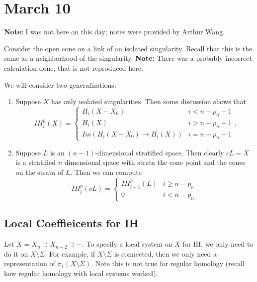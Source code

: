 \documentclass[leqno, openany]{memoir}
\theoremstyle{definition}
\theoremstyle{remark}
\theoremstyle{plain}
\theoremstyle{definition}
\theoremstyle{remark}
\begin{document}
\chapter{March 10}%
\label{cha:march_10}

\textbf{Note:} I was not here on this day; notes were provided by Arthur Wang.

Consider the open cone on a link of an isolated singularity. Recall that this is the same as a neighborhood of the singularity. \textbf{Note:} There was a probably incorrect calculation done, that is not reproduced here.

We will consider two generalizations:
\begin{enumerate}
    \item Suppose $X$ has only isolated singularities. Then some discussion shows that
        \[ IH_i^{\overline{p}}(X) = \begin{cases}
            H_i(X - X_0) & i < n - p_n - 1 \\
            H_i(X) & i > n - p_n - 1 \\
            Im(H_i(X-X_0) \to H_i(X)) & i = n - p_n - 1
        \end{cases}. \]
    \item Suppose $L$ is an $(n-1)$-dimensional stratified space. Then clearly $cL = X$ is a stratified $n$ dimensional space with strata the cone point and the cones on the strata of $L$. Then we can compute
        \[ IH_i^{\overline{p}}(cL) = \begin{cases}
            IH_{i-1}^{\overline{p}}(L) & i \geq n - p_n \\
            0 & i < n - p_n
        \end{cases}. \]
\end{enumerate}

\section{Local Coeffieicents for IH}%
\label{sec:local_coeffieicents_for_ih}

Let $X = X_n \supset X_{n-2} \supset \cdots$. To specify a local system on $X$ for IH, we only need to do it on $X \setminus \Sigma$. For example, if $X \setminus \Sigma$ is connected, then we only need a representation of $\pi_1(X \setminus \Sigma)$. Note this is not true for regular homology (recall how regular homology with local systems worked).
\end{document}
